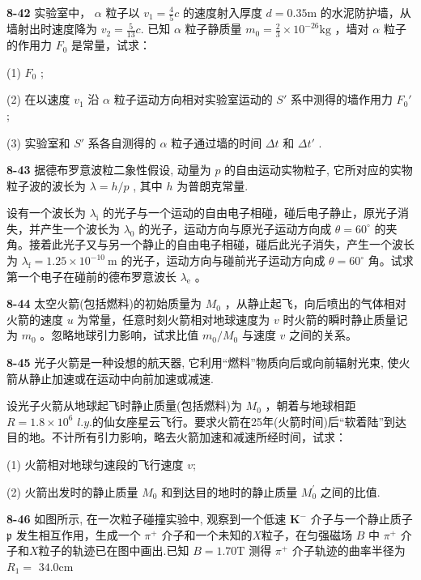 \vfill

\textbf{8-42} 实验室中， $\alpha$ 粒子以 $v_{1} = \frac{4}{5} c$ 的速度射入厚度 $d = 0.35\mathrm{m}$ 的水泥防护墙，从墙射出时速度降为 $v_{2} = \frac{5}{13} c.$ 已知 $\alpha$ 粒子静质量 $m_0 = \frac{2}{3} \times 10^{-26}\mathrm{kg}$ ，墙对 $\alpha$ 粒子的作用力 $F_{0}$ 是常量，试求：

(1) $F_{0}$ ;

(2) 在以速度 $v_{1}$ 沿 $\alpha$ 粒子运动方向相对实验室运动的 $S'$ 系中测得的墙作用力 $F_{0}'$ ;

(3) 实验室和 $S'$ 系各自测得的 $\alpha$ 粒子通过墙的时间 $\Delta t$ 和 $\Delta t'$ .


\vfill

\newpage

\textbf{8-43} 据德布罗意波粒二象性假设, 动量为 $p$ 的自由运动实物粒子, 它所对应的实物粒子波的波长为 $\lambda = h/p$ , 其中 $h$ 为普朗克常量.

设有一个波长为 $\lambda_{\mathrm{i}}$ 的光子与一个运动的自由电子相碰，碰后电子静止，原光子消失，并产生一个波长为 $\lambda_0$ 的光子，运动方向与原光子运动方向成 $\theta = 60^{\circ}$ 的夹角。接着此光子又与另一个静止的自由电子相碰，碰后此光子消失，产生一个波长为 $\lambda_{\mathrm{f}} = 1.25 \times 10^{-10} \mathrm{~m}$ 的光子，运动方向与碰前光子运动方向成 $\theta = 60^{\circ}$ 角。试求第一个电子在碰前的德布罗意波长 $\lambda_{\mathrm{e}}$ 。

\vfill

\textbf{8-44} 太空火箭(包括燃料)的初始质量为 $M_{0}$ ，从静止起飞，向后喷出的气体相对火箭的速度 $u$ 为常量，任意时刻火箭相对地球速度为 $v$ 时火箭的瞬时静止质量记为 $m_{0}$ 。忽略地球引力影响，试求比值 $m_{0}/M_{0}$ 与速度 $v$ 之间的关系。

\vfill

\newpage

\textbf{8-45} 光子火箭是一种设想的航天器, 它利用“燃料”物质向后或向前辐射光束, 使火箭从静止加速或在运动中向前加速或减速.

设光子火箭从地球起飞时静止质量(包括燃料)为 $M_{0}$ ，朝着与地球相距 $R=1.8\times10^{6}$ $l$.$y$.的仙女座星云飞行。要求火箭在25年(火箭时间)后“软着陆”到达目的地。不计所有引力影响，略去火箭加速和减速所经时间，试求：

(1) 火箭相对地球匀速段的飞行速度 $v$;

(2) 火箭出发时的静止质量 $M_{0}$ 和到达目的地时的静止质量 $M_{0}^{\prime}$ 之间的比值.

\vfill

\textbf{8-46} 如图所示, 在一次粒子碰撞实验中, 观察到一个低速 $\mathbf{K}^{-}$ 介子与一个静止质子 $\mathfrak{p}$ 发生相互作用，生成一个 $\pi^{+}$ 介子和一个未知的$X$粒子，在匀强磁场 $B$ 中 $\pi^{+}$ 介子和$X$粒子的轨迹已在图中画出.已知 $B = 1.70\mathrm{T}$ 测得 $\pi^{+}$ 介子轨迹的曲率半径为 $R_{1} =$ $34.0\mathrm{cm}$

